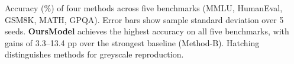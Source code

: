 \caption{Accuracy (\%) of four methods across five benchmarks (MMLU, HumanEval, GSM8K, MATH, GPQA). Error bars show sample standard deviation over 5 seeds. \textbf{OursModel} achieves the highest accuracy on all five benchmarks, with gains of 3.3--13.4 pp over the strongest baseline (Method-B). Hatching distinguishes methods for greyscale reproduction.}
